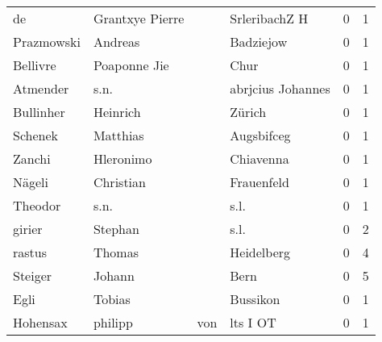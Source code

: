 \begin{center}
\begin{tiny}
\begin{longtabu}{llllrr}
                       de &                    Grantxye Pierre &             &                               SrleribachZ H &          0 &         1 \\
               Prazmowski &                            Andreas &             &                                   Badziejow &          0 &         1 \\
                 Bellivre &                       Poaponne Jie &             &                                        Chur &          0 &         1 \\
                 Atmender &                               s.n. &             &                           abrjcius Johannes &          0 &         1 \\
                Bullinher &                           Heinrich &             &                                      Zürich &          0 &         1 \\
                  Schenek &                           Matthias &             &                                  Augsbifceg &          0 &         1 \\
                   Zanchi &                          Hleronimo &             &                                   Chiavenna &          0 &         1 \\
                   Nägeli &                          Christian &             &                                  Frauenfeld &          0 &         1 \\
                  Theodor &                               s.n. &             &                                        s.l. &          0 &         1 \\
                   girier &                            Stephan &             &                                        s.l. &          0 &         2 \\
                   rastus &                             Thomas &             &                                  Heidelberg &          0 &         4 \\
                  Steiger &                             Johann &             &                                        Bern &          0 &         5 \\
                     Egli &                             Tobias &             &                                    Bussikon &          0 &         1 \\
                 Hohensax &                            philipp &         von &                                    lts I OT &          0 &         1 \\

\end{longtabu}
\end{tiny}
\end{center}
